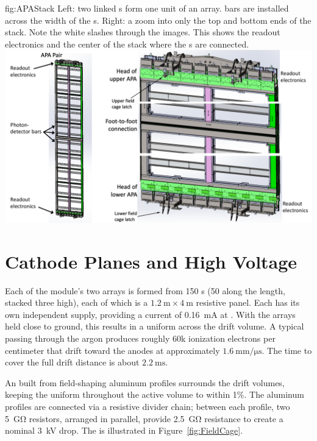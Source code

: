 \begin{dunefigure}{fig:APAStack}
{Left: two linked s form one unit of an  array.  bars are installed across the width of the s. Right: a zoom into only the top and bottom ends of the  stack. Note the white slashes through the images. This shows the readout electronics and the center of the stack where the s are connected.}
\includegraphics[width=\textwidth]{graphics/APAStack}
\end{dunefigure}

\section{Cathode Planes and High Voltage}

Each of the module's two  arrays is formed from 150 s (50 along the length, stacked three high), each of which is a $\SI{1.2}{\meter}\times\SI{4}{\meter}$ resistive panel. Each  has its own independent  supply, providing a current of \SI{0.16}{\milli\ampere} at \sptargetdriftvolt{}. 
With the   arrays held close to ground, this results in a uniform \spmaxfield \efield across the drift volume.  A typical  passing through the argon produces roughly 60k ionization electrons per centimeter that drift toward the anodes at approximately $\SI{1.6}{\mm/\micro\second}$. The time to cover the full drift distance is about $\SI{2.2}{\milli\second}$.

An  built from field-shaping aluminum profiles surrounds the drift volumes, keeping  the \efield uniform throughout the active  volume to within 1\%.  The aluminum profiles are connected via a resistive divider chain; between each profile, two \SI{5}{\giga\ohm} resistors, arranged in parallel, provide  \SI{2.5}{\giga\ohm} resistance to create a nominal \SI{3}{\kilo\volt} drop. The  is illustrated in Figure~\ref{fig:FieldCage}.

